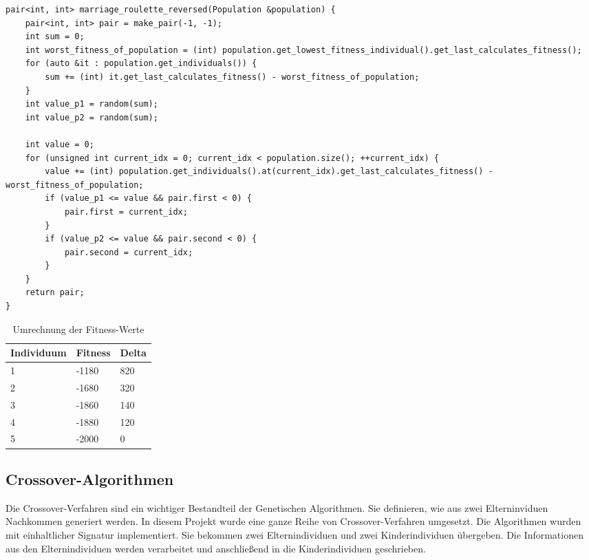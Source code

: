 \begin{minipage}[!htb]{\linewidth}
\begin{lstlisting}[caption={Marriage-Roulette Algorithmus}, firstnumber=1, captionpos=b, label=lst:marriage]
pair<int, int> marriage_roulette_reversed(Population &population) {
	pair<int, int> pair = make_pair(-1, -1);
	int sum = 0;
	int worst_fitness_of_population = (int) population.get_lowest_fitness_individual().get_last_calculates_fitness();
	for (auto &it : population.get_individuals()) {
		sum += (int) it.get_last_calculates_fitness() - worst_fitness_of_population;
	}
	int value_p1 = random(sum);
	int value_p2 = random(sum);

	int value = 0;
	for (unsigned int current_idx = 0; current_idx < population.size(); ++current_idx) {
		value += (int) population.get_individuals().at(current_idx).get_last_calculates_fitness() - worst_fitness_of_population;
		if (value_p1 <= value && pair.first < 0) {
			pair.first = current_idx;
		}
		if (value_p2 <= value && pair.second < 0) {
			pair.second = current_idx;
		}
	}
	return pair;
}
\end{lstlisting}
\end{minipage}
\begin{table}[!htb]
\center
\caption{Umrechnung der Fitness-Werte}
\begin{tabular}{|l|l|l|}
 Individuum & Fitness & Delta \\ 
\hline
 1 & -1180 & 820 \\  
 2 & -1680 & 320 \\  
 3 & -1860 & 140 \\  
 4 & -1880 & 120 \\  
 5 & -2000 & 0 \\  
\end{tabular}
\label{tab:roulette}
\end{table}

\subsection{Crossover-Algorithmen}
Die Crossover-Verfahren sind ein wichtiger Bestandteil der Genetischen Algorithmen. Sie definieren, wie aus zwei Elterninviduen Nachkommen generiert werden.
In diesem Projekt wurde eine ganze Reihe von Crossover-Verfahren umgesetzt. Die Algorithmen wurden mit einhaltlicher Signatur implementiert. Sie bekommen zwei Elternindividuen und zwei Kinderindividuen übergeben.
Die Informationen aus den Elternindividuen werden verarbeitet und anschließend in die Kinderindividuen geschrieben.

